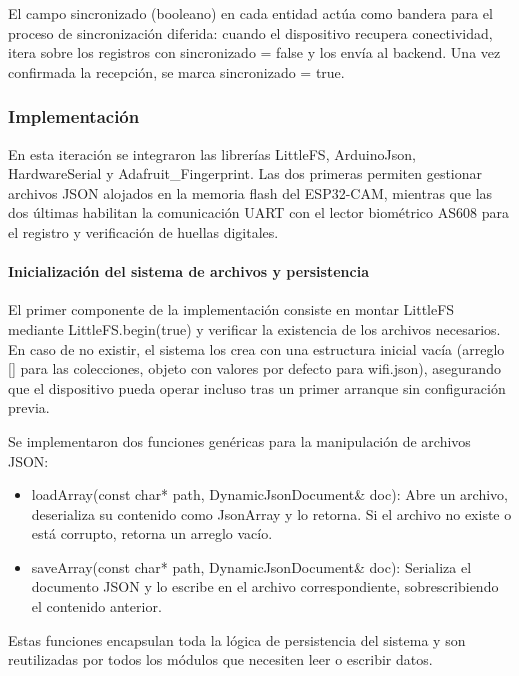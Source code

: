 El campo sincronizado (booleano) en cada entidad actúa como bandera para el proceso de sincronización diferida: cuando el dispositivo recupera conectividad, itera sobre los registros con sincronizado = false y los envía al backend. Una vez confirmada la recepción, se marca sincronizado = true.

\subsubsection{Implementación}

En esta iteración se integraron las librerías LittleFS, ArduinoJson, HardwareSerial y Adafruit\_Fingerprint. Las dos primeras permiten gestionar archivos JSON alojados en la memoria flash del ESP32-CAM, mientras que las dos últimas habilitan la comunicación UART con el lector biométrico AS608 para el registro y verificación de huellas digitales.

\paragraph{Inicialización del sistema de archivos y persistencia}

El primer componente de la implementación consiste en montar LittleFS mediante LittleFS.begin(true) y verificar la existencia de los archivos necesarios. En caso de no existir, el sistema los crea con una estructura inicial vacía (arreglo [] para las colecciones, objeto con valores por defecto para wifi.json), asegurando que el dispositivo pueda operar incluso tras un primer arranque sin configuración previa.

Se implementaron dos funciones genéricas para la manipulación de archivos JSON:

\begin{itemize}
    \item loadArray(const char* path, DynamicJsonDocument\& doc): Abre un archivo, deserializa su contenido como JsonArray y lo retorna. Si el archivo no existe o está corrupto, retorna un arreglo vacío.
    \item saveArray(const char* path, DynamicJsonDocument\& doc): Serializa el documento JSON y lo escribe en el archivo correspondiente, sobrescribiendo el contenido anterior.
\end{itemize}

Estas funciones encapsulan toda la lógica de persistencia del sistema y son reutilizadas por todos los módulos que necesiten leer o escribir datos.

